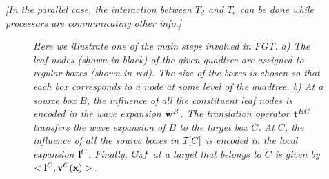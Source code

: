 \documentclass[conference]{IEEEtran}
\begin{document}
{\em [In the parallel case, the interaction between $T_d$ and $T_e$ can be done while processors are communicating other info.] }




\begin{figure}[htp]
\begin{center}
 \end{center}
\caption{\em Here we illustrate one of the main steps involved in
  FGT. a) The leaf nodes (shown in black) of the given quadtree
  are assigned to regular boxes (shown in red). The size of the boxes
  is chosen so that each box corresponds to a node at some level of
  the quadtree. b) At a source box $B$, the influence of all  
  the constituent leaf nodes is encoded in the wave expansion
  $\mathbf{w}^B$. The translation operator  
  $\mathbf{t}^{BC}$ transfers the wave expansion of $B$ to the target box
  $C$. At $C$, the influence of all the source
  boxes in $\mathcal{I}[C]$ is encoded in the local expansion $\mathbf{l}^C$.
  Finally, $G_{\delta} f$ at a target that belongs to $C$ is given by
  $<\mathbf{l}^C, \mathbf{v}^C(\mathbf{x})>$.}\label{fig:Grid}
\end{figure}
\end{document}
